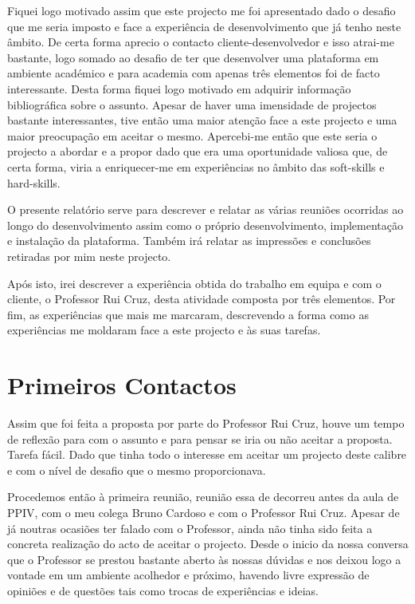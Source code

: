 \documentclass[a4paper,12pt,journal,twoside,compsoc]{PPIEEEtran}
\begin{document}
Fiquei logo motivado assim que este projecto me foi apresentado dado o desafio que me seria imposto e face a experiência de desenvolvimento que já tenho neste âmbito. De certa forma aprecio o contacto cliente-desenvolvedor e isso atrai-me bastante, logo somado ao desafio de ter que desenvolver uma plataforma em ambiente académico e para academia com apenas três elementos foi de facto interessante. Desta forma fiquei logo motivado em adquirir informação bibliográfica sobre o assunto. Apesar de haver uma imensidade de projectos bastante interessantes, tive então uma maior atenção face a este projecto e uma maior preocupação em aceitar o mesmo. Apercebi-me então que este seria o projecto a abordar e a propor dado que era uma oportunidade valiosa que, de certa forma, viria a enriquecer-me em experiências no âmbito das soft-skills e hard-skills.

O presente relatório serve para descrever e relatar as várias reuniões ocorridas ao longo do desenvolvimento assim como o próprio desenvolvimento, implementação e instalação da plataforma. Também irá relatar as impressões e conclusões retiradas por mim neste projecto.

Após isto, irei descrever a experiência obtida do trabalho em equipa e com o cliente, o Professor Rui Cruz, desta atividade composta por três elementos. Por fim, as experiências que mais me marcaram, descrevendo a forma como as experiências me moldaram face a este projecto e às suas tarefas.


\section{Primeiros Contactos}

Assim que foi feita a proposta por parte do Professor Rui Cruz, houve um tempo de reflexão para com o assunto e para pensar se iria ou não aceitar a proposta. Tarefa fácil. Dado que tinha todo o interesse em aceitar um projecto deste calibre e com o nível de desafio que o mesmo proporcionava.

Procedemos então à primeira reunião, reunião essa de decorreu antes da aula de PPIV, com o meu colega Bruno Cardoso e com o Professor Rui Cruz. Apesar de já noutras ocasiões ter falado com o Professor, ainda não tinha sido feita a concreta realização do acto de aceitar o projecto. Desde o inicio da nossa conversa que o Professor se prestou bastante aberto às nossas dúvidas e nos deixou logo a vontade em um ambiente acolhedor e próximo, havendo livre expressão de opiniões e de questões tais como trocas de experiências e ideias.
\end{document}
